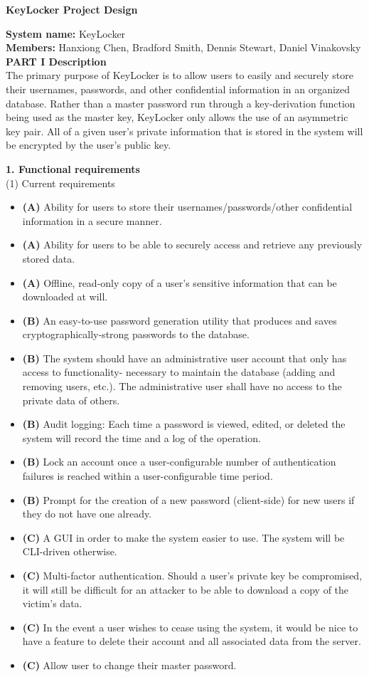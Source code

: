 \documentclass[11pt, letterpaper]{article}
\newcommand{\DesignSection}[1]
{\noindent\textbf{#1}\\}
\begin{document}
\centerline{\textbf{KeyLocker Project Design}}
\smallskip
\noindent\textbf{System name: }KeyLocker\\
\noindent\textbf{Members: }Hanxiong Chen, Bradford Smith, Dennis Stewart, Daniel Vinakovsky\\

\DesignSection{PART I Description}
\noindent
The primary purpose of KeyLocker is to allow users to easily and securely store their usernames, passwords, and other confidential information in an organized database. Rather than a master password run through a key-derivation function being used as the master key, KeyLocker only allows the use of an asymmetric key pair. All of a given user's private information that is stored in the system will be encrypted by the user's public key.

\DesignSection{1. Functional requirements}
\smallskip
\noindent(1) Current requirements
\begin{itemize} \itemsep1pt \parskip0pt 
\item \textbf{(A) }Ability for users to store their usernames/passwords/other confidential information in a secure manner.
\item \textbf{(A) }Ability for users to be able to securely access and retrieve any previously stored data.
\item \textbf{(A) }Offline, read-only copy of a user's sensitive information that can be downloaded at will.
\item \textbf{(B) }An easy-to-use password generation utility that produces and saves cryptographically-strong passwords to the database.
\item \textbf{(B) }The system should have an administrative user account that only has access to functionality- necessary to maintain the database (adding and removing users, etc.). The administrative user shall have no access to the private data of others.
\item \textbf{(B) }Audit logging: Each time a password is viewed, edited, or deleted the system will record the time and a log of the operation.
\item \textbf{(B) }Lock an account once a user-configurable number of authentication failures is reached within a user-configurable time period.
\item \textbf{(B) }Prompt for the creation of a new password (client-side) for new users if they do not have one already.
\item \textbf{(C) }A \ac{GUI} in order to make the system easier to use. The system will be \ac{CLI}-driven otherwise.
\item \textbf{(C) }Multi-factor authentication. Should a user's private key be compromised, it will still be difficult for an attacker to be able to download a copy of the victim's data.
\item \textbf{(C) }In the event a user wishes to cease using the system, it would be nice to have a feature to delete their account and all associated data from the server.
\item \textbf{(C) }Allow user to change their master password.
\end{itemize}
\end{document}
